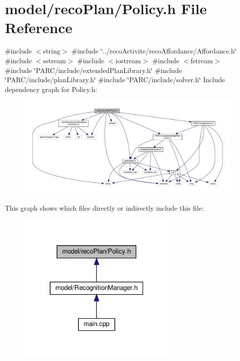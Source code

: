 \section{model/reco\+Plan/\+Policy.h File Reference}
\label{_policy_8h}
{\ttfamily \#include $<$string$>$}\newline
{\ttfamily \#include \char`\"{}../reco\+Activite/reco\+Affordance/\+Affordance.\+h\char`\"{}}\newline
{\ttfamily \#include $<$sstream$>$}\newline
{\ttfamily \#include $<$iostream$>$}\newline
{\ttfamily \#include $<$fstream$>$}\newline
{\ttfamily \#include \char`\"{}P\+A\+R\+C/include/extended\+Plan\+Library.\+h\char`\"{}}\newline
{\ttfamily \#include \char`\"{}P\+A\+R\+C/include/plan\+Library.\+h\char`\"{}}\newline
{\ttfamily \#include \char`\"{}P\+A\+R\+C/include/solver.\+h\char`\"{}}\newline
Include dependency graph for Policy.\+h\+:
\nopagebreak
\begin{figure}[H]
\begin{center}
\leavevmode
\includegraphics[width=350pt]{_policy_8h__incl}
\end{center}
\end{figure}
This graph shows which files directly or indirectly include this file\+:
\nopagebreak
\begin{figure}[H]
\begin{center}
\leavevmode
\includegraphics[width=223pt]{_policy_8h__dep__incl}
\end{center}
\end{figure}
